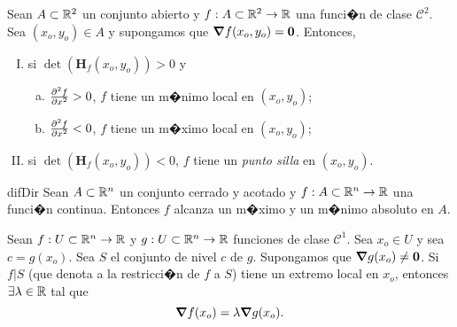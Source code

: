 \documentclass[a4paper]{scrartcl} %
\begin{document}
\begin{theorem} \label{teo:derivada_2da}
\mbox{}

 Sean $A \subset \mathbb{R}^2$ un conjunto abierto y $f: A \subset \mathbb{R}^2 \to \mathbb{R}$ una funci�n de clase $\mathcal{C}^2$. Sea $(x_o,y_o) \in A$ y supongamos que $\grad f(x_o,y_o) = \mathbf{0}$. Entonces,  
 \begin{enumerate} [I.]
    \item si $\det(\mathbf{H}_f (x_o,y_o)) > 0$ y
    \begin{enumerate}[(a)]
        \item $\pdv[2]{f}{x} (x_o,y_o) > 0$, $f$ tiene un m�nimo local en $(x_o,y_o)$;
        \item $\pdv[2]{f}{x} (x_o,y_o) < 0$, $f$ tiene un m�ximo local en $(x_o,y_o)$;
    \end{enumerate}
    \item si $\det(\mathbf{H}_f (x_o,y_o)) < 0$, $f$ tiene un \emph{punto silla} en $(x_o,y_o)$.
 \end{enumerate}

\end{theorem}

\begin{theorem} \label{teo:weier}difDir
  Sean $A \subset \mathbb{R}^n$ un conjunto cerrado y acotado y $f: A \subset \mathbb{R}^n \to \mathbb{R}$ una funci�n continua. Entonces $f$ alcanza un m�ximo y un m�nimo absoluto en $A$.
\end{theorem}

\begin{theorem}  \label{teo:lagrange}
    Sean $f:U \subset \mathbb{R}^n \to \mathbb{R}$ y $g:U \subset \mathbb{R}^n \to \mathbb{R}$ funciones de clase $\mathcal{C}^1$. Sea $x_o \in U$ y sea $c = g(x_o)$. Sea $S$ el conjunto de nivel $c$ de $g$. Supongamos que $\grad g (x_o) \ne \mathbf{0}$. Si $f|S$ (que denota a la restricci�n de $f$ a $S$) tiene un extremo local en $x_o$, entonces $\exists \lambda \in \mathbb{R}$ tal que
    \[
     \grad f (x_o) = \lambda \grad g (x_o).
    \]
\end{theorem}






% 
% 
\end{document}
